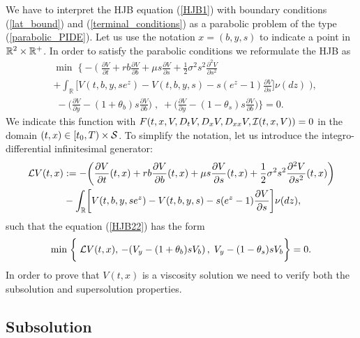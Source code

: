 We have to interpret the HJB equation (\ref{HJB1}) with boundary conditions (\ref{lat_bound}) and (\ref{terminal_conditions}) 
as a parabolic problem of the type (\ref{parabolic_PIDE}). 
Let us use the notation $x = (b,y,s)$ to indicate a point in $\mathbb{R}^2\times \mathbb{R}^+$. In order to satisfy the parabolic conditions we reformulate the HJB as 
\begin{align}\label{HJB22}
& \min \; \biggl\{ - \biggl( \; \frac{\partial V}{\partial t} + rb\frac{\partial V}{\partial b} 
+ \mu s \frac{\partial V}{\partial s} + \frac{1}{2}\sigma^2 s^2 \frac{\partial^2 V}{\partial s^2} \\ \nonumber
&+ \int_\mathbb{R}
\biggl[ V(t,b,y,se^z) - V(t,b,y,s) - s(e^z-1)\frac{\partial V}{\partial s} \biggr] \nu(dz) \; \biggr) ,\\ \nonumber
& \; - \biggl( \frac{\partial V}{\partial y}-(1+\theta_b) s \frac{\partial V}{\partial b} \biggr) \; 
, \; + \biggl(\frac{\partial V}{\partial y}-(1-\theta_s)s \frac{\partial V}{\partial b} \biggr) \biggr\} = 0. 
\end{align}
We indicate this function with
$ F(t,x,V,D_t V,D_{x} V,D_{xx}V,\mathcal{I}(t,x,V)) = 0$ in the domain $(t,x) \in [t_0,T) \times \mathcal{S}$.
To simplify the notation, let us introduce the integro-differential infinitesimal generator:
\begin{align*}
 \mathcal{L} V(t,x) &:= -\biggl( \frac{\partial V}{\partial t}(t,x) + rb\frac{\partial V}{\partial b}(t,x) 
  + \mu s \frac{\partial V}{\partial s}(t,x) + \frac{1}{2}\sigma^2 s^2 \frac{\partial^2V}{\partial s^2}(t,x)\biggr) \\
  &- \int_{\mathbb{R}}
\biggl[ V(t,b,y,se^z) - V(t,b,y,s) - s(e^z-1)\frac{\partial V}{\partial s} \biggr] \nu(dz),
\end{align*}
such that the equation (\ref{HJB22}) has the form
\begin{equation}\label{qvi_min}
  \min \; \biggl\{ \; \mathcal{L} V(t,x),
  \, -(V_y-(1+\theta_b)sV_b) \, , \; V_y-(1-\theta_s)s V_b \biggr\} = 0.
\end{equation}
In order to prove that $V(t,x)$ is a viscosity solution we need to verify both the subsolution and supersolution properties.



\subsection{Subsolution}


